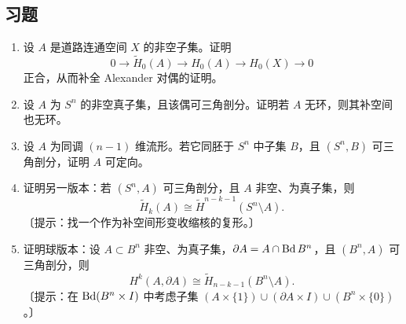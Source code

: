 \subsection*{习题}
\begin{enumerate}
\item 设 $A$ 是道路连通空间 $X$ 的非空子集。证明
\[0\to\widetilde H_0(A)\to H_0(A)\to H_0(X)\to0\]
正合，从而补全 Alexander 对偶的证明。
\item 设 $A$ 为 $S^n$ 的非空真子集，且该偶可三角剖分。证明若 $A$ 无环，则其补空间也无环。
\item 设 $A$ 为同调 $(n-1)$ 维流形。若它同胚于 $S^n$ 中子集 $B$，且 $(S^n,B)$ 可三角剖分，证明 $A$ 可定向。
\item 证明另一版本：若 $(S^n,A)$ 可三角剖分，且 $A$ 非空、为真子集，则
\[\widetilde H_k(A)\cong\widetilde H^{n-k-1}(S^n\setminus A).\]
〔提示：找一个作为补空间形变收缩核的复形。〕
\item 证明球版本：设 $A\subset B^n$ 非空、为真子集，$\partial A=A\cap\operatorname{Bd} B^n$，且 $(B^n,A)$ 可三角剖分，则
\[H^k(A,\partial A)\cong\widetilde H_{n-k-1}(B^n\setminus A).\]
〔提示：在 $\operatorname{Bd}(B^n\times I)$ 中考虑子集 $(A\times\{1\})\cup(\partial A\times I)\cup(B^n\times\{0\})$。〕
\end{enumerate}
